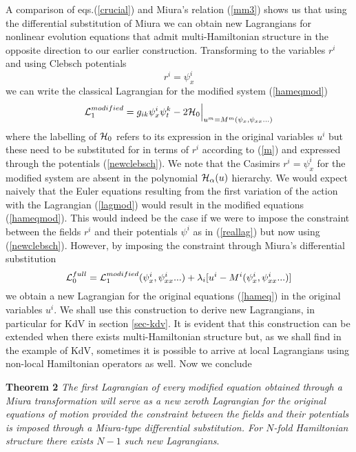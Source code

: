 \documentclass[a4paper,12pt]{article}
\begin{document}
A comparison of eqs.(\ref{crucial}) and Miura's relation
(\ref{mm3}) shows us that using the differential substitution of
Miura we can obtain new Lagrangians for nonlinear evolution
equations that admit multi-Hamiltonian structure in the opposite
direction to our earlier construction. Transforming to the
variables $r^i$ and using Clebsch potentials
\begin{equation}
r^i = \psi_x^i \label{newclebsch}
\end{equation}
we can write the classical Lagrangian for the modified system
(\ref{hameqmod})
\begin{equation}
{\cal L}_1^{modified} = g_{ik} \psi_x^i  \psi_t^k - 2 {\cal H}_0
\Big|_{u^m=M^m(\psi_x,\psi_{xx}...) } \label{lagmod}
\end{equation}
where the labelling of ${\cal H}_0$ refers to its expression in
the original variables $u^i$ but these need to be substituted for
in terms of $r^i$ according to (\ref{m}) and expressed through the
potentials (\ref{newclebsch}). We note that the Casimirs $ r^i =
\psi^i_x$ for the modified system are absent in the polynomial
${\cal H}_\alpha(u)$ hierarchy. We would expect naively that the
Euler equations resulting from the first variation of the action
with the Lagrangian (\ref{lagmod}) would result in the modified
equations (\ref{hameqmod}). This would indeed be the case if we
were to impose the constraint between the fields $r^i$ and their
potentials $\psi^i$ as in (\ref{reallag}) but now using
(\ref{newclebsch}). However, by imposing the constraint through
Miura's differential substitution
\begin{equation}
{\cal L}_0^{full} = {\cal L}_1^{modified}( \psi^i_x,
\psi^i_{xx}...) + \lambda_i [ u^i - M^i(\psi^i_x,\psi^i_{xx}...) ]
\label{reallag2}
\end{equation}
we obtain a new Lagrangian for the original equations
(\ref{hameq}) in the original variables $u^i$. We shall use this
construction to derive new Lagrangians, in particular for KdV in
section \ref{sec-kdv}. It is evident that this construction can be
extended when there exists multi-Hamiltonian structure but, as we
shall find in the example of KdV, sometimes it is possible to
arrive at local Lagrangians using non-local Hamiltonian operators
as well. Now we conclude

{\bf Theorem 2} {\it The first Lagrangian of every modified
equation obtained through a Miura transformation will serve as a
new zeroth Lagrangian for the original equations of motion
provided the constraint between the fields and their potentials is
imposed through a Miura-type differential substitution. For
$N$-fold Hamiltonian structure there exists $N-1$ such new
Lagrangians}.
\end{document}
